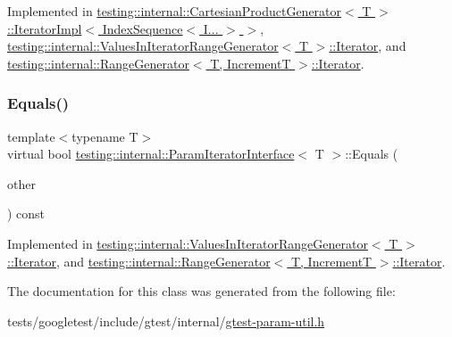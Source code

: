 Implemented in \hyperlink{classtesting_1_1internal_1_1CartesianProductGenerator_1_1IteratorImpl_3_01IndexSequence_3_01I_8_8_8_01_4_01_4_ab7052f320ab8ff3113a3e744a1bff07e}{testing\+::internal\+::\+Cartesian\+Product\+Generator$<$ T $>$\+::\+Iterator\+Impl$<$ Index\+Sequence$<$ I... $>$ $>$}, \hyperlink{classtesting_1_1internal_1_1ValuesInIteratorRangeGenerator_1_1Iterator_a55bd2a0d5a630478e32ec2efe08e37e4}{testing\+::internal\+::\+Values\+In\+Iterator\+Range\+Generator$<$ T $>$\+::\+Iterator}, and \hyperlink{classtesting_1_1internal_1_1RangeGenerator_1_1Iterator_acbdfc5919d37fb9514914afb041e50ff}{testing\+::internal\+::\+Range\+Generator$<$ T, Increment\+T $>$\+::\+Iterator}.

\mbox{\label{classtesting_1_1internal_1_1ParamIteratorInterface_a9d811697a752d46f7bd6a0082f9040a3}} 
\subsubsection{\texorpdfstring{Equals()}{Equals()}}
{\footnotesize\ttfamily template$<$typename T$>$ \\
virtual bool \hyperlink{classtesting_1_1internal_1_1ParamIteratorInterface}{testing\+::internal\+::\+Param\+Iterator\+Interface}$<$ T $>$\+::Equals (\begin{DoxyParamCaption}\item[{const \hyperlink{classtesting_1_1internal_1_1ParamIteratorInterface}{Param\+Iterator\+Interface}$<$ T $>$ \&}]{other }\end{DoxyParamCaption}) const\hspace{0.3cm}{\ttfamily [pure virtual]}}



Implemented in \hyperlink{classtesting_1_1internal_1_1ValuesInIteratorRangeGenerator_1_1Iterator_a75604bc318aca22ff8607b68bfb44e96}{testing\+::internal\+::\+Values\+In\+Iterator\+Range\+Generator$<$ T $>$\+::\+Iterator}, and \hyperlink{classtesting_1_1internal_1_1RangeGenerator_1_1Iterator_a534406abbddb137d7672c2b53d5bff0b}{testing\+::internal\+::\+Range\+Generator$<$ T, Increment\+T $>$\+::\+Iterator}.



The documentation for this class was generated from the following file\+:\begin{DoxyCompactItemize}
\item 
tests/googletest/include/gtest/internal/\hyperlink{gtest-param-util_8h}{gtest-\/param-\/util.\+h}\end{DoxyCompactItemize}
